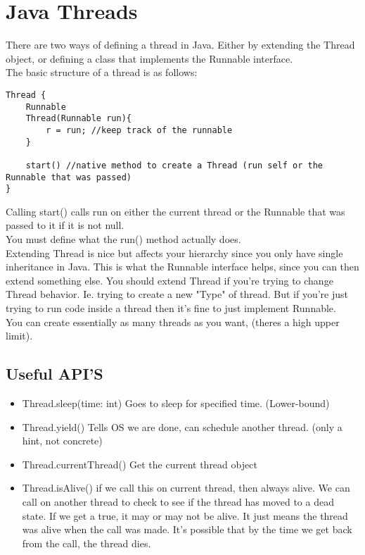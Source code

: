 \documentclass[12pt]{article}
\theoremstyle{definition}
\begin{document}
\section{Java Threads}
There are two ways of defining a thread in Java. Either by extending the Thread object, or defining a class that implements the Runnable interface. 
\\ \linebreak
The basic structure of a thread is as follows:
\begin{lstlisting}
Thread {
	Runnable
	Thread(Runnable run){
		r = run; //keep track of the runnable
	}
	
	start() //native method to create a Thread (run self or the Runnable that was passed)
}
\end{lstlisting}
Calling start() calls run on either the current thread or the Runnable that was passed to it if it is not null. 
\\ \linebreak
You must define what the run() method actually does. 
\\ \linebreak
Extending Thread is nice but affects your hierarchy since you only have single inheritance in Java. This is what the Runnable interface helps, since you can then extend something else. You should extend Thread if you're trying to change Thread behavior. Ie. trying to create a new "Type" of thread. But if you're just trying to run code inside a thread then it's fine to just implement Runnable. 
\\ \linebreak
You can create essentially as many threads as you want, (theres a high upper limit). 
\\ \linebreak
\subsection{Useful API'S}

\begin{itemize}
	\item Thread.sleep(time: int) Goes to sleep for specified time. (Lower-bound)
	\item Thread.yield() Tells OS we are done, can schedule another thread. (only a hint, not concrete)
	\item Thread.currentThread() Get the current thread object
	\item Thread.isAlive() if we call this on current thread, then always alive. We can call on another thread to check to see if the thread has moved to a dead state. If we get a true, it may or may not be alive. It just means the thread was alive when the call was made. It's possible that by the time we get back from the call, the thread dies.
\end{itemize}
\end{document}

